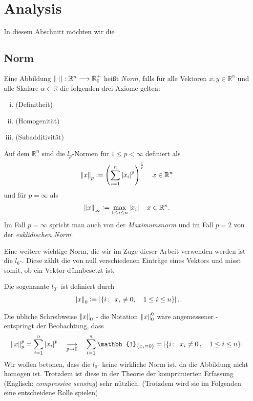 \section{Analysis}

In diesem Abschnitt möchten wir die 

\subsection{Norm}

\begin{defn}
\label{norm}
Eine Abbildung $\left\lVert \cdot \right\rVert \colon \mathbb{R}^n \longrightarrow {\mathbb {R} }_{0}^{+}$ heißt \textit{Norm}, falls für alle Vektoren $x,y\in \mathbb{R}^n$ und alle Skalare $\alpha \in \mathbb{R}$ die folgenden drei Axiome gelten:
\begin{enumerate}[(i)]
\item {}(Definitheit)
\item {}(Homogenität)
\item {}(Subadditivität)
\end{enumerate}
\end{defn}

\begin{defn} 
Auf dem $\mathbb{R}^n$ sind die $l_p$-Normen für $1 \leq p < \infty$ definiert als
$$\left\lVert x \right\rVert_p \vcentcolon= \left( \sum_{i=1}^{n} \left\lvert x_i \right\rvert^{p} \right) ^{\frac{1}{p}} \quad x \in \mathbb{R}^{n}$$
und für $p = \infty$ als
$$\left\lVert x \right\rVert_{\infty} \vcentcolon= \max_{1 \leq i \leq n} \left\lvert x_i \right\rvert \quad x \in \mathbb{R}^{n}.$$
Im Fall $p = \infty$ spricht man auch von der \textit{Maximumsnorm} und im Fall $p = 2$ von der \textit{euklidischen Norm}.
\end{defn}

Eine weitere wichtige Norm, die wir im Zuge dieser Arbeit verwenden werden ist die $l_0$-. Diese zählt die von null verschiedenen Einträge eines Vektors und misst somit, ob ein Vektor dünnbesetzt ist.

\begin{defn}
Die sogenannte $l_0$- ist definiert durch
$$\left\lVert x \right\rVert_{0} \vcentcolon= \left|\{i \colon \enspace x_i \neq 0 , \quad 1 \leq i \leq n\}\right|.$$
\end{defn}

Die übliche Schreibweise $\left\lVert x \right\rVert_0$ - die Notation $\left\lVert x \right\rVert_{0}^{0}$ wäre angemessener - entspringt der Beobachtung, dass 
$$\norm{x}_{p}^{p} = \sum_{i=1}^{n} \abs{x_i}^p \quad \underset{p \rightarrow 0}{\longrightarrow} \quad \sum_{i=1}^{n} \mathbb{1}_{\{x_i = 0\}} = \left|\{i \colon \enspace x_i \neq 0\, , \quad 1 \leq i \leq n\}\right|$$
Wir wollen betonen, dass die $l_0$- keine wirkliche Norm ist, da die Abbildung nicht homogen ist. Trotzdem ist diese  in der Theorie der komprimierten Erfassung (Englisch: \textit{compressive sensing}) sehr nützlich. (Trotzdem wird sie im Folgenden eine entscheidene Rolle spielen)

